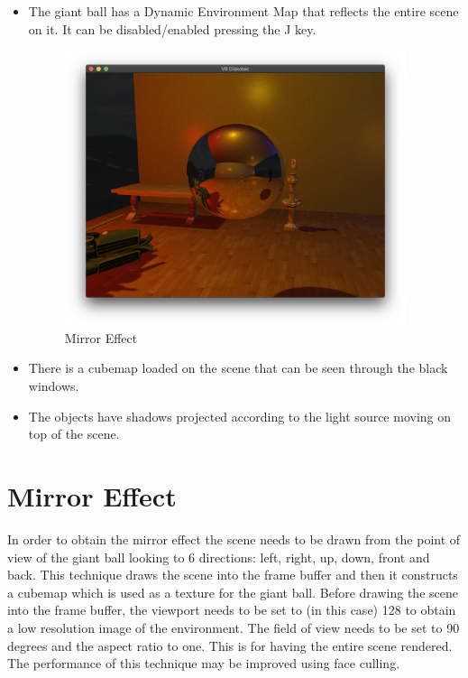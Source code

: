 \documentclass{article}
\begin{document}
\begin{itemize}
 \item The giant ball has a Dynamic Environment Map that reflects the entire scene on it. It can be disabled/enabled pressing the J key. 
 \begin{figure}[htp]
        \centering
        \includegraphics[width=10cm]{mirrow.png}
        \caption{Mirror Effect}
        \label{fig:galaxy}
    \end{figure}
    \item There is a cubemap loaded on the scene that can be seen through the 
    black windows.
    \item The objects have shadows projected according to the light source moving on top of the scene.
\end{itemize}

\section{Mirror Effect}
In order to obtain the mirror effect the scene needs to be drawn from the point of view of the giant ball looking to 6 directions: left, right, up, down, front and back. This technique draws the scene into the frame buffer and then it constructs a cubemap which is used as a texture for the giant ball. Before drawing the scene into the frame buffer, the viewport needs to be set to (in this case) 128 to obtain
a low resolution image of the environment. The field of view needs to be set to 90 degrees and the aspect ratio to one. This is for having the entire scene rendered. The performance of this technique may be improved using face culling.
\end{document}
